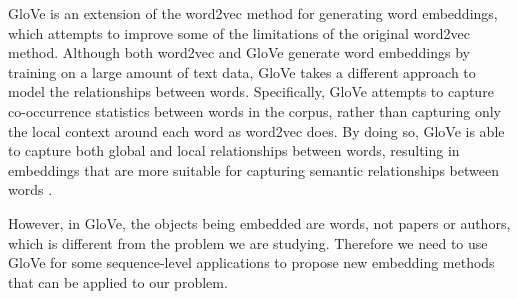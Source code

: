 \documentclass[conference]{IEEEtran}
\begin{document}
GloVe \cite{GloVe} is an extension of the word2vec method for
generating word embeddings, which attempts to improve some of the
limitations of the original word2vec method. Although both word2vec and
GloVe generate word embeddings \cite{https://doi.org/10.48550/arxiv.2301.10656} by training on a large amount of text
data, GloVe takes a different approach to model the relationships
between words. Specifically, GloVe attempts to capture co-occurrence
statistics between words in the corpus, rather than capturing only the
local context around each word as word2vec does. By doing so, GloVe is
able to capture both global and local relationships between words,
resulting in embeddings that are more suitable for capturing semantic
relationships between words \cite{7478417}.

However, in GloVe, the objects being embedded are words, not papers
or authors, which is different from the problem we are studying.
Therefore we need to use GloVe for some sequence-level applications to
propose new embedding methods that can be applied to our problem.


%
%


%
\end{document}
